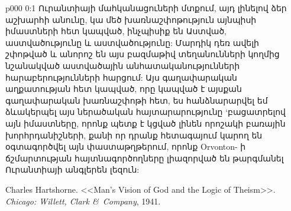 \author{Աստվածային Խորհրդական}
\vs p000 0:1 Ուրանտիայի մահկանացուների մտքում, այդ լինելով ձեր աշխարհի անունը, կա մեծ խառնաշփոթություն այնպիսի իմաստների հետ կապված, ինչպիսիք են Աստված, աստվածությունը և աստվածությունը: Մարդիկ դեռ ավելի շփոթված և անորոշ են այս բազմաթիվ տեղանունների կողմից նշանակված աստվածային անհատականությունների հարաբերությունների հարցում: Այս գաղափարական աղքատության հետ կապված, որը կապված է այսքան գաղափարական խառնաշփոթի հետ, ես հանձնարարվել եմ ձևակերպել այս ներածական հայտարարությունը `բացատրելով այն իմաստները, որոնք պետք է կցված լինեն որոշակի բառային խորհրդանիշների, քանի որ դրանք հետագայում կարող են օգտագործվել այն փաստաթղթերում, որոնք Orvonton- ի ճշմարտության հայտնագործողները լիազորված են թարգմանել Ուրանտիայի անգլերեն լեզուն:
\quizlink
\begin{thebibliography}{100}
\latintext
{}
Charles Hartshorne.
{<<Man's Vision of God and the Logic of Theism>>.}
{\em Chicago: Willett, Clark \&\ Company}, 1941.
\end{thebibliography}
